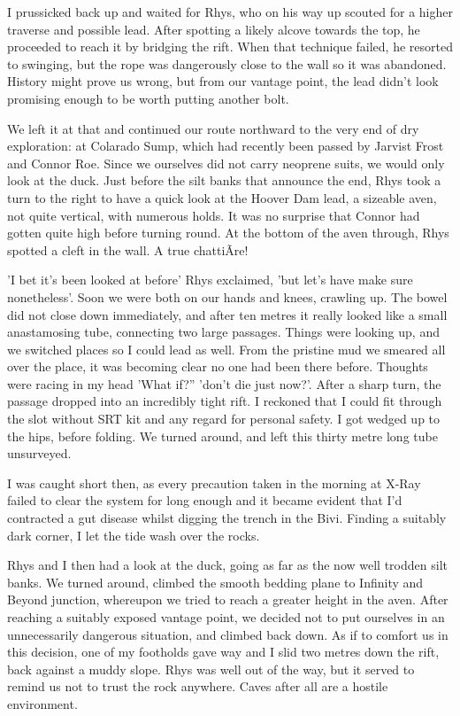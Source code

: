 \documentclass[onecolumn]{book}
\begin{document}
I prussicked back up and waited for Rhys, who on his way up scouted for a higher traverse and possible lead. After spotting a likely alcove towards the top, he proceeded to reach it by bridging the rift. When that technique failed, he resorted to swinging, but the rope was dangerously close to the wall so it was abandoned. History might prove us wrong, but from our vantage point, the lead didn't look promising enough to be worth putting another bolt. 

We left it at that and continued our route northward to the very end of dry exploration: at Colarado Sump, which had recently been passed by Jarvist Frost and Connor Roe. Since we ourselves did not carry neoprene suits, we would only look at the duck. Just before the silt banks that announce the end, Rhys took a turn to the right to have a quick look at the Hoover Dam lead, a sizeable aven, not quite vertical, with numerous holds. It was no surprise that Connor had gotten quite high before turning round. At the bottom of the aven through, Rhys spotted a cleft in the wall. A true chattiÃre! 

'I bet it's been looked at before' Rhys exclaimed, 'but let's have make sure nonetheless'. Soon we were both on our hands and knees, crawling up. The bowel did not close down immediately, and after ten metres it really looked like a small anastamosing tube, connecting two large passages. Things were looking up, and we switched places so I could lead as well. From the pristine mud we smeared all over the place, it was becoming clear no one had been there before. Thoughts were racing in my head 'What if?'' 'don't die just now?'. After a sharp turn, the passage dropped into an incredibly tight rift. I reckoned that I could fit through the slot without SRT kit and any regard for personal safety. I got wedged up to the hips, before folding. We turned around, and left this thirty metre long tube unsurveyed. 

I was caught short then, as every precaution taken in the morning at X-Ray failed to clear the system for long enough and it became evident that I'd contracted a gut disease whilst digging the trench in the Bivi. Finding a suitably dark corner, I let the tide wash over the rocks. 

Rhys and I then had a look at the duck, going as far as the now well trodden silt banks. We turned around, climbed the smooth bedding plane to Infinity and Beyond junction, whereupon we tried to reach a greater height in the aven. After reaching a suitably exposed vantage point, we decided not to put ourselves in an unnecessarily dangerous situation, and climbed back down. As if to comfort us in this decision, one of my footholds gave way and I slid two metres down the rift, back against a muddy slope. Rhys was well out of the way, but it served to remind us not to trust the rock anywhere. Caves after all are a hostile environment. 
\end{document}
